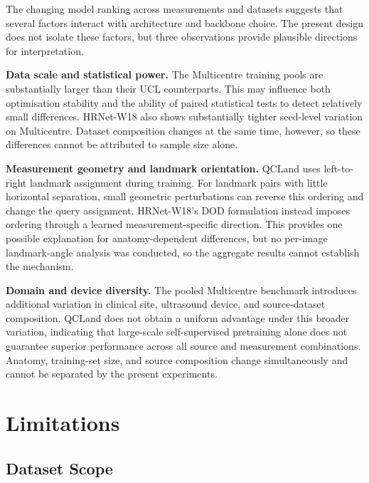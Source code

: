 The changing model ranking across measurements and datasets suggests
that several factors interact with architecture and backbone choice.
The present design does not isolate these factors, but three
observations provide plausible directions for interpretation.

\textbf{Data scale and statistical power.}
The Multicentre training pools are substantially larger than their UCL
counterparts. This may influence both optimisation stability and the
ability of paired statistical tests to detect relatively small
differences. HRNet-W18 also shows substantially tighter seed-level
variation on Multicentre. Dataset composition changes at the same
time, however, so these differences cannot be attributed to sample
size alone.

\textbf{Measurement geometry and landmark orientation.}
QCLand uses left-to-right landmark assignment during training. For
landmark pairs with little horizontal separation, small geometric
perturbations can reverse this ordering and change the query
assignment. HRNet-W18's DOD formulation instead imposes ordering
through a learned measurement-specific direction. This provides one
possible explanation for anatomy-dependent differences, but no
per-image landmark-angle analysis was conducted, so the aggregate
results cannot establish the mechanism.

\textbf{Domain and device diversity.}
The pooled Multicentre benchmark introduces additional variation in
clinical site, ultrasound device, and source-dataset composition.
QCLand does not obtain a uniform advantage under this broader
variation, indicating that large-scale self-supervised pretraining
alone does not guarantee superior performance across all source and
measurement combinations. Anatomy, training-set size, and source
composition change simultaneously and cannot be separated by the
present experiments.



\section{Limitations}
\label{sec:discussion-limitations}


\subsection{Dataset Scope}

